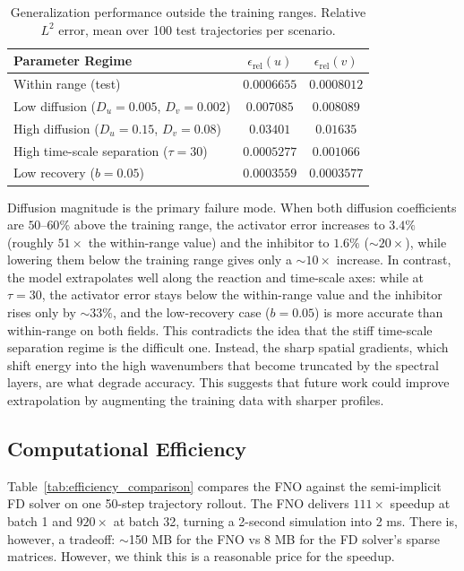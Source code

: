 \documentclass[runningheads]{llncs}
\begin{document}
\begin{table}[!htb]
\centering
\begin{sc}
\fontsize{8}{9.6}\selectfont
\setlength{\tabcolsep}{4pt}
\begin{tabular}{lcc}
\toprule
Parameter Regime & $\epsilon_{\text{rel}}(u)$ & $\epsilon_{\text{rel}}(v)$ \\
\midrule
Within range (test) & $0.0006655$ & $0.0008012$ \\
Low diffusion ($D_u{=}0.005$, $D_v{=}0.002$) & $0.007085$ & $0.008089$ \\
High diffusion ($D_u{=}0.15$, $D_v{=}0.08$) & $0.03401$ & $0.01635$ \\
High time-scale separation ($\tau{=}30$) & $0.0005277$ & $0.001066$ \\
Low recovery ($b{=}0.05$) & $0.0003559$ & $0.0003577$ \\
\bottomrule
\end{tabular}
\end{sc}
\smallskip
\caption{Generalization performance outside the training ranges. Relative $L^2$ error, mean over 100 test trajectories per scenario.}
\label{tab:extrapolation}
\end{table}

Diffusion magnitude is the primary failure mode. When both diffusion coefficients are $50$--$60\%$ above the training range, the activator error increases to $3.4\%$ (roughly $51\times$ the within-range value) and the inhibitor to $1.6\%$ ($\sim$$20\times$), while lowering them below the training range gives only a $\sim$$10\times$ increase. In contrast, the model extrapolates well along the reaction and time-scale axes: while at $\tau{=}30$, the activator error stays below the within-range value and the inhibitor rises only by $\sim$$33\%$, and the low-recovery case ($b{=}0.05$) is more accurate than within-range on both fields. This contradicts the idea that the stiff time-scale separation regime is the difficult one. Instead, the sharp spatial gradients, which shift energy into the high wavenumbers that become truncated by the spectral layers, are what degrade accuracy. This suggests that future work could improve extrapolation by augmenting the training data with sharper profiles.

\subsection{Computational Efficiency}
\label{sec:efficiency_results}

Table~\ref{tab:efficiency_comparison} compares the FNO against the semi-implicit FD solver on one 50-step trajectory rollout. The FNO delivers $111\times$ speedup at batch 1 and $920\times$ at batch 32, turning a 2-second simulation into 2 ms. There is, however, a tradeoff: $\sim$150 MB for the FNO vs 8 MB for the FD solver's sparse matrices. However, we think this is a reasonable price for the speedup.
\end{document}
